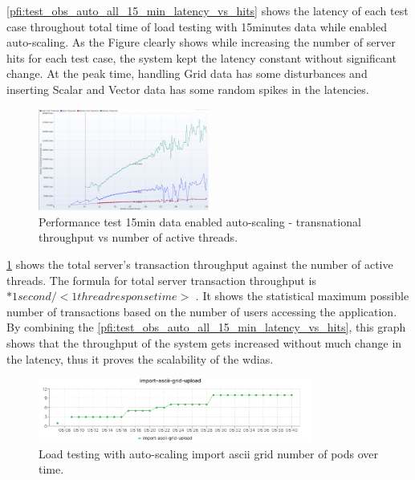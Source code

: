 \documentclass[conference]{IEEEtran}
\begin{document}
\cref{pfi:test_obs_auto_all_15_min_latency_vs_hits} shows the latency of each test case throughout total time of load testing with 15minutes data while enabled auto-scaling. As the Figure clearly shows while increasing the number of server hits for each test case, the system kept the latency constant without significant change. At the peak time, handling Grid data has some disturbances and inserting Scalar and Vector data has some random spikes in the latencies.

\begin{figure}[htbp]
\centerline{\includegraphics[width=0.5\textwidth]{results/obs/all_auto/obs_all_auto_15m_transaction_throughtput_vs_threads.png}}
\caption{Performance test 15min data enabled auto-scaling - transnational throughput vs number of active threads.}
\label{pfi:test_obs_auto_all_15_min_throughput_vs_threads}
\end{figure}

\cref{pfi:test_obs_auto_all_15_min_throughput_vs_threads} shows the total server's transaction throughput against the number of active threads.
The formula for total server transaction throughput is \(<active threads> * 1 second / <1  thread response time>\) \cite{JMeterPluginsTransactionPlugin}. It shows the statistical maximum possible number of transactions based on the number of users accessing the application.
By combining the \cref{pfi:test_obs_auto_all_15_min_latency_vs_hits}, this graph shows that the throughput of the system gets increased without much change in the latency, thus it proves the scalability of the \acrshort{wdias}.

\begin{figure}[htp]
    \centering
    \includegraphics[width=0.8\textwidth]{results/obs/all_auto/obs_all_auto_15m_import_grid_pod.png}
    \caption{Load testing with auto-scaling import ascii grid number of pods over time.}
    \label{pfi:obs_all_auto_15m_import_grid_pod}
\end{figure}
\end{document}
